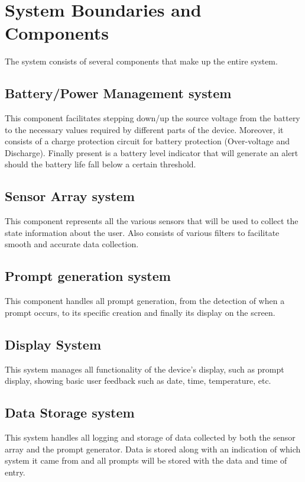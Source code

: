 \documentclass{article}
\begin{document}
\newpage
\section{System Boundaries and Components}
The system consists of several components that make up the entire system.

\subsection{\label{Battery_sec}Battery/Power Management system}
This component facilitates stepping down/up the source voltage from the battery to the necessary values required by different parts of the device. Moreover, it consists of a 										charge protection circuit for battery protection (Over-voltage and Discharge). Finally present is a battery level indicator that will generate an alert should the battery life fall below a certain threshold.

\subsection{\label{Sensor_sec}Sensor Array system}
This component represents all the various sensors that will be used to collect the state information about the user. Also consists of various filters to facilitate smooth and accurate data collection.

\subsection{\label{Prompt_sec}Prompt generation system}
This component handles  all prompt generation, from the detection of when a prompt occurs, to its specific creation and finally its display on the screen.

\subsection{\label{Display_sec}Display System}
This system manages all functionality of the device's display, such as prompt display, showing basic user feedback such as date, time, temperature, etc.

\subsection{\label{Storage_sec}Data Storage system}
This system handles all logging and storage of data collected by both the sensor array and the prompt generator. Data is stored along with an indication of which system it came from and all prompts will be 				stored with the data and time of entry.
\end{document}

